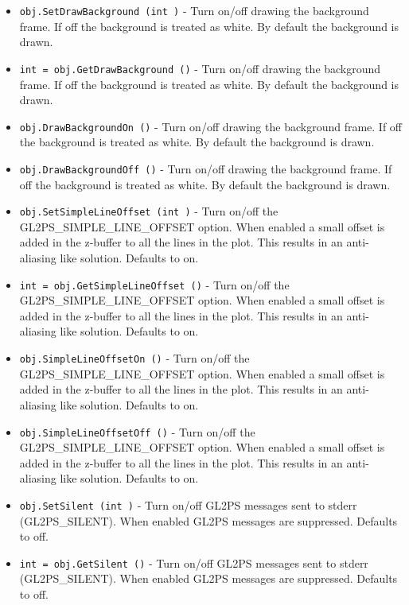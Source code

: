 \begin{itemize}
\item  \verb|obj.SetDrawBackground (int )| -  Turn on/off drawing the background frame.  If off the background
 is treated as white.  By default the background is drawn.

\item  \verb|int = obj.GetDrawBackground ()| -  Turn on/off drawing the background frame.  If off the background
 is treated as white.  By default the background is drawn.

\item  \verb|obj.DrawBackgroundOn ()| -  Turn on/off drawing the background frame.  If off the background
 is treated as white.  By default the background is drawn.

\item  \verb|obj.DrawBackgroundOff ()| -  Turn on/off drawing the background frame.  If off the background
 is treated as white.  By default the background is drawn.

\item  \verb|obj.SetSimpleLineOffset (int )| -  Turn on/off the GL2PS\_SIMPLE\_LINE\_OFFSET option.  When enabled a
 small offset is added in the z-buffer to all the lines in the
 plot.  This results in an anti-aliasing like solution.  Defaults to
 on.

\item  \verb|int = obj.GetSimpleLineOffset ()| -  Turn on/off the GL2PS\_SIMPLE\_LINE\_OFFSET option.  When enabled a
 small offset is added in the z-buffer to all the lines in the
 plot.  This results in an anti-aliasing like solution.  Defaults to
 on.

\item  \verb|obj.SimpleLineOffsetOn ()| -  Turn on/off the GL2PS\_SIMPLE\_LINE\_OFFSET option.  When enabled a
 small offset is added in the z-buffer to all the lines in the
 plot.  This results in an anti-aliasing like solution.  Defaults to
 on.

\item  \verb|obj.SimpleLineOffsetOff ()| -  Turn on/off the GL2PS\_SIMPLE\_LINE\_OFFSET option.  When enabled a
 small offset is added in the z-buffer to all the lines in the
 plot.  This results in an anti-aliasing like solution.  Defaults to
 on.

\item  \verb|obj.SetSilent (int )| -  Turn on/off GL2PS messages sent to stderr (GL2PS\_SILENT).  When
 enabled GL2PS messages are suppressed.  Defaults to off.

\item  \verb|int = obj.GetSilent ()| -  Turn on/off GL2PS messages sent to stderr (GL2PS\_SILENT).  When
 enabled GL2PS messages are suppressed.  Defaults to off.


\end{itemize}
